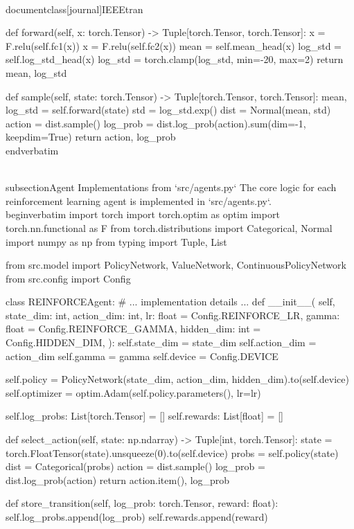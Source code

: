 \\documentclass[journal]{IEEEtran}
\begin{document}
    def forward(self, x: torch.Tensor) -> Tuple[torch.Tensor, torch.Tensor]:
        x = F.relu(self.fc1(x))
        x = F.relu(self.fc2(x))
        mean = self.mean_head(x)
        log_std = self.log_std_head(x)
        log_std = torch.clamp(log_std, min=-20, max=2)
        return mean, log_std

    def sample(self, state: torch.Tensor) -> Tuple[torch.Tensor, torch.Tensor]:
        mean, log_std = self.forward(state)
        std = log_std.exp()
        dist = Normal(mean, std)
        action = dist.sample()
        log_prob = dist.log_prob(action).sum(dim=-1, keepdim=True)
        return action, log_prob
\\end{verbatim}

\\subsection{Agent Implementations from `src/agents.py`}
The core logic for each reinforcement learning agent is implemented in `src/agents.py`.
\\begin{verbatim}
import torch
import torch.optim as optim
import torch.nn.functional as F
from torch.distributions import Categorical, Normal
import numpy as np
from typing import Tuple, List

from src.model import PolicyNetwork, ValueNetwork, ContinuousPolicyNetwork
from src.config import Config

class REINFORCEAgent:
    # ... implementation details ...
    def __init__(
        self,
        state_dim: int,
        action_dim: int,
        lr: float = Config.REINFORCE_LR,
        gamma: float = Config.REINFORCE_GAMMA,
        hidden_dim: int = Config.HIDDEN_DIM,
    ):
        self.state_dim = state_dim
        self.action_dim = action_dim
        self.gamma = gamma
        self.device = Config.DEVICE

        self.policy = PolicyNetwork(state_dim, action_dim, hidden_dim).to(self.device)
        self.optimizer = optim.Adam(self.policy.parameters(), lr=lr)

        self.log_probs: List[torch.Tensor] = []
        self.rewards: List[float] = []

    def select_action(self, state: np.ndarray) -> Tuple[int, torch.Tensor]:
        state = torch.FloatTensor(state).unsqueeze(0).to(self.device)
        probs = self.policy(state)
        dist = Categorical(probs)
        action = dist.sample()
        log_prob = dist.log_prob(action)
        return action.item(), log_prob

    def store_transition(self, log_prob: torch.Tensor, reward: float):
        self.log_probs.append(log_prob)
        self.rewards.append(reward)
\end{document}
